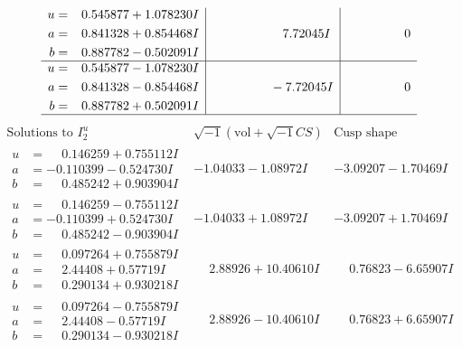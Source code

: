 \documentclass[1p]{elsarticle_modified}
\theoremstyle{definition}
\newcommand{\I}{\sqrt{-1}}
\begin{document}
$$\begin{array}{c|c|c}
\begin{aligned}
u &= \phantom{-}0.545877 + 1.078230 I \\
a &= \phantom{-}0.841328 + 0.854468 I \\
b &= \phantom{-}0.887782 - 0.502091 I\end{aligned}
 & \phantom{-0.000000 -}7.72045 I & \phantom{-0.000000 } 0 \\ \hline\begin{aligned}
u &= \phantom{-}0.545877 - 1.078230 I \\
a &= \phantom{-}0.841328 - 0.854468 I \\
b &= \phantom{-}0.887782 + 0.502091 I\end{aligned}
 & \phantom{-0.000000 } -7.72045 I & \phantom{-0.000000 } 0\\
 \hline 
 \end{array}$$\newpage$$\begin{array}{c|c|c}  
\text{Solutions to }I^u_{2}& \I (\text{vol} + \sqrt{-1}CS) & \text{Cusp shape}\\
 \hline 
\begin{aligned}
u &= \phantom{-}0.146259 + 0.755112 I \\
a &= -0.110399 - 0.524730 I \\
b &= \phantom{-}0.485242 + 0.903904 I\end{aligned}
 & -1.04033 - 1.08972 I & -3.09207 - 1.70469 I \\ \hline\begin{aligned}
u &= \phantom{-}0.146259 - 0.755112 I \\
a &= -0.110399 + 0.524730 I \\
b &= \phantom{-}0.485242 - 0.903904 I\end{aligned}
 & -1.04033 + 1.08972 I & -3.09207 + 1.70469 I \\ \hline\begin{aligned}
u &= \phantom{-}0.097264 + 0.755879 I \\
a &= \phantom{-}2.44408 + 0.57719 I \\
b &= \phantom{-}0.290134 + 0.930218 I\end{aligned}
 & \phantom{-}2.88926 + 10.40610 I & \phantom{-}0.76823 - 6.65907 I \\ \hline\begin{aligned}
u &= \phantom{-}0.097264 - 0.755879 I \\
a &= \phantom{-}2.44408 - 0.57719 I \\
b &= \phantom{-}0.290134 - 0.930218 I\end{aligned}
 & \phantom{-}2.88926 - 10.40610 I & \phantom{-}0.76823 + 6.65907 I \\ \hline\begin{aligned}

\end{aligned}
\end{array}$$
\end{document}
